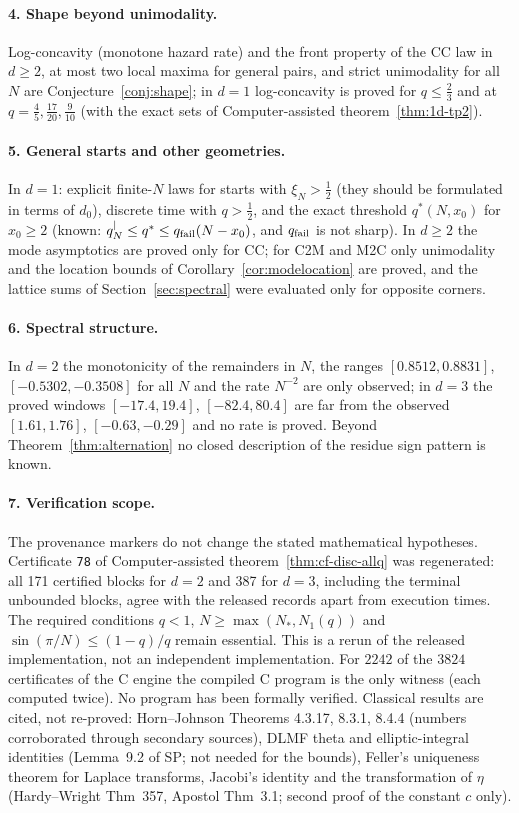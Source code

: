 \documentclass[10pt,a4paper]{article}
\theoremstyle{plain}
\theoremstyle{definition}
\newcommand{\SPE}{\textsf{SP}}
\newcommand{\qseg}{q^{|}_N}
\begin{document}
\paragraph{4. Shape beyond unimodality.} Log-concavity (monotone hazard rate) and the front property of the CC law in $d\ge2$, at most two local maxima for general pairs, and strict unimodality for all $N$ are Conjecture~\ref{conj:shape}; in $d=1$ log-concavity is proved for $q\le\frac23$ and at $q=\frac45,\frac{17}{20},\frac9{10}$ (with the exact sets of Computer-assisted theorem~\ref{thm:1d-tp2}).

\paragraph{5. General starts and other geometries.} In $d=1$: explicit finite-$N$ laws for starts with $\xi_N>\frac12$ (they should be formulated in terms of $d_0$), discrete time with $q>\frac12$, and the exact threshold $q^*(N,x_0)$ for $x_0\ge2$ (known: $\qseg\le q^*\le q_{\rm fail}(N-x_0)$, and $q_{\rm fail}$ is not sharp). In $d\ge2$ the mode asymptotics are proved only for CC; for C2M and M2C only unimodality and the location bounds of Corollary~\ref{cor:modelocation} are proved, and the lattice sums of Section~\ref{sec:spectral} were evaluated only for opposite corners.

\paragraph{6. Spectral structure.} In $d=2$ the monotonicity of the remainders in $N$, the ranges $[0.8512,0.8831]$, $[-0.5302,-0.3508]$ for all $N$ and the rate $N^{-2}$ are only observed; in $d=3$ the proved windows $[-17.4,19.4]$, $[-82.4,80.4]$ are far from the observed $[1.61,1.76]$, $[-0.63,-0.29]$ and no rate is proved. Beyond Theorem~\ref{thm:alternation} no closed description of the residue sign pattern is known.

\paragraph{7. Verification scope.} The provenance markers do not change the stated mathematical hypotheses. Certificate \texttt{78} of Computer-assisted theorem~\ref{thm:cf-disc-allq} was regenerated: all 171 certified blocks for $d=2$ and 387 for $d=3$, including the terminal unbounded blocks, agree with the released records apart from execution times. The required conditions $q<1$, $N\ge\max(N_*,N_1(q))$ and $\sin(\pi/N)\le(1-q)/q$ remain essential. This is a rerun of the released implementation, not an independent implementation. For $2242$ of the $3824$ certificates of the C engine the compiled C program is the only witness (each computed twice). No program has been formally verified. Classical results are cited, not re-proved: Horn--Johnson Theorems 4.3.17, 8.3.1, 8.4.4 (numbers corroborated through secondary sources), DLMF theta and elliptic-integral identities (Lemma~9.2 of \SPE; not needed for the bounds), Feller's uniqueness theorem for Laplace transforms, Jacobi's identity and the transformation of $\eta$ (Hardy--Wright Thm~357, Apostol Thm~3.1; second proof of the constant $c$ only).
\end{document}
